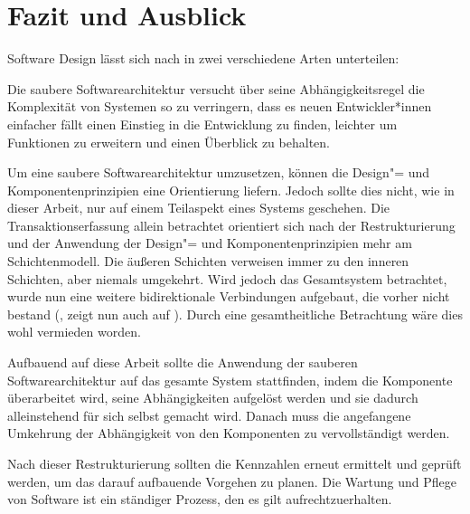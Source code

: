 \chapter{Fazit und Ausblick}
\label{ch:Fazit}

Software Design lässt sich nach  in zwei verschiedene Arten unterteilen: 

Die saubere Softwarearchitektur versucht über seine Abhängigkeitsregel die Komplexität von Systemen so zu verringern, dass es neuen Entwickler*innen einfacher fällt einen Einstieg in die Entwicklung zu finden, leichter um Funktionen zu erweitern und einen Überblick zu behalten.

Um eine saubere Softwarearchitektur umzusetzen, können die Design"= und Komponentenprinzipien eine Orientierung liefern. Jedoch sollte dies nicht, wie in dieser Arbeit, nur auf einem Teilaspekt eines Systems geschehen. Die Transaktionserfassung allein betrachtet orientiert sich nach der Restrukturierung und der Anwendung der Design"= und Komponentenprinzipien mehr am Schichtenmodell. Die äußeren Schichten verweisen immer zu den inneren Schichten, aber niemals umgekehrt. Wird jedoch das Gesamtsystem betrachtet, wurde nun eine weitere bidirektionale Verbindungen aufgebaut, die vorher nicht bestand (,  zeigt nun auch auf ). Durch eine gesamtheitliche Betrachtung wäre dies wohl vermieden worden.

Aufbauend auf diese Arbeit sollte die Anwendung der sauberen Softwarearchitektur auf das gesamte System stattfinden, indem die Komponente  überarbeitet wird, seine Abhängigkeiten aufgelöst werden und sie dadurch alleinstehend für sich selbst gemacht wird. Danach muss die angefangene Umkehrung der Abhängigkeit von den Komponenten  zu  vervollständigt werden.

Nach dieser Restrukturierung sollten die Kennzahlen erneut ermittelt und geprüft werden, um das darauf aufbauende Vorgehen zu planen. Die Wartung und Pflege von Software ist ein ständiger Prozess, den es gilt aufrechtzuerhalten. 